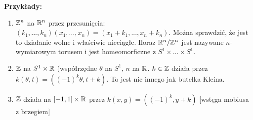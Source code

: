 \textbf{Przykłady:} 
\begin{enumerate}
\item $\mathbb{Z}^n$ na $\mathbb{R}^n$ przez przesunięcia: $(k_1,...,k_n)(x_1,...,x_n)=(x_1+k_1,...,x_n+k_n)$. Można sprawdzić, że jest to działanie wolne i właściwie nieciągłe. Iloraz $\mathbb{R}^n/\mathbb{Z}^n$ jest nazywane $n$-wymiarowym torusem i jest homeomorficzne z $S^1\times...\times S^1$.
\item $\mathbb{Z}$ na $S^1\times\mathbb{R}$ (współrzędne $\theta$ na $S^1$, $n$ na $\mathbb{R}$. $k\in\mathbb{Z}$ działa przez $k(\theta,t)=((-1)^k\theta,t+k)$. To jest nic innego jak butelka Kleina.
\item $\mathbb{Z}$ działa na $[-1,1]\times\mathbb{R}$ przez $k(x,y)=((-1)^k,y+k)$ [wstęga mobiusa z brzegiem]
\end{enumerate}























